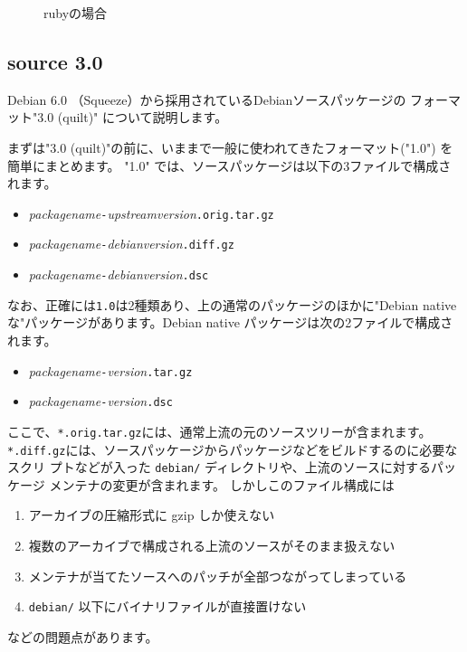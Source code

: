 \documentclass[mingoth,a4paper]{jsarticle}
\begin{document}
\begin{figure}[h]

\caption{rubyの場合}
\label{fig:ruby_setting}
\end{figure}


\subsection{source 3.0}

Debian 6.0 （Squeeze）から採用されているDebianソースパッケージの
フォーマット"3.0 (quilt)" について説明します。

まずは"3.0 (quilt)"の前に、いままで一般に使われてきたフォーマット("1.0")
を簡単にまとめます。
"1.0" では、ソースパッケージは以下の3ファイルで構成されます。
\begin{itemize}
 \item \textit{packagename}\verb|-|\textit{upstreamversion}\verb|.orig.tar.gz|
 \item \textit{packagename}\verb|-|\textit{debianversion}\verb|.diff.gz|
 \item \textit{packagename}\verb|-|\textit{debianversion}\verb|.dsc|
\end{itemize}

なお、正確には\verb|1.0|は2種類あり、上の通常のパッケージのほかに"Debian   
nativeな"パッケージがあります。Debian native パッケージは次の2ファイルで構成されます。
\begin{itemize}
 \item \textit{packagename}\verb|-|\textit{version}\verb|.tar.gz|
 \item \textit{packagename}\verb|-|\textit{version}\verb|.dsc|
\end{itemize}

ここで、\verb|*.orig.tar.gz|には、通常上流の元のソースツリーが含まれます。
\verb|*.diff.gz|には、ソースパッケージからパッケージなどをビルドするのに必要なスクリ
プトなどが入った \verb|debian/| ディレクトリや、上流のソースに対するパッケージ
メンテナの変更が含まれます。
しかしこのファイル構成には
\begin{enumerate}
 \item アーカイブの圧縮形式に gzip しか使えない
 \item 複数のアーカイブで構成される上流のソースがそのまま扱えない
 \item メンテナが当てたソースへのパッチが全部つながってしまっている
 \item \verb|debian/| 以下にバイナリファイルが直接置けない
\end{enumerate}
などの問題点があります。
\end{document}
